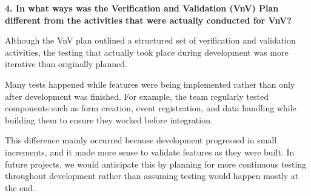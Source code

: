 \documentclass[12pt, titlepage]{article}
\begin{document}
\textbf{4. In what ways was the Verification and Validation (VnV) Plan
different from the activities that were actually conducted for VnV?}

Although the VnV plan outlined a structured set of verification and
validation activities, the testing that actually took place during
development was more iterative than originally planned.

Many tests happened while features were being implemented rather than
only after development was finished. For example, the team regularly
tested components such as form creation, event registration, and data
handling while building them to ensure they worked before integration.

This difference mainly occurred because development progressed in small
increments, and it made more sense to validate features as they were
built. In future projects, we would anticipate this by planning for more
continuous testing throughout development rather than assuming testing
would happen mostly at the end.
\end{document}

